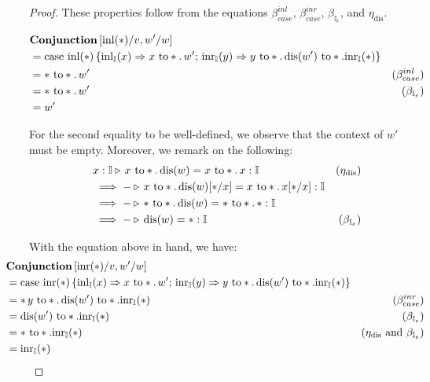   \begin{proof}
    These properties follow from the equations $\beta_{case}^{inl}$, $\beta_{case}^{inr}$, $\beta_{\mathbb{I}_{e}}$, and $\eta_{\text{dis}}$.

    \begin{equation*}
    \begin{split}
      & \textbf{Conjunction} \, [\mathrm{inl}(*)/v,w'/w ] \\
      & = \text{case } \mathrm{inl}(*)\,
  \{\mathrm{inl}_{\mathbb{I}}(x) \Rightarrow x \text{ to} *. \, w' ;
  \, \mathrm{inr}_{\mathbb{I}}(y) \Rightarrow y \text{ to} *. \,  \text{dis}(w') \text{ to} *. \mathrm{inr}_{\mathbb{I}}(*)
  \} \\
  & = * \text{ to} *. \, w' & (\beta_{case}^{inl}) \\
  & =  * \text{ to} *. \, w' & (\beta_{\mathbb{I}_{e}}) \\
  & = w'
    \end{split}
    \end{equation*}

    For the second equality to be well-defined, we observe that the context of $ w'$ must be empty. Moreover, we remark on the following:
    \begin{align*}
       & x:\mathbb{I} \triangleright \, x \text{ to} *. \, \text{dis}(w) = x \text{ to} *. \, x : \mathbb{I}    & (\eta_{\text{dis}}) \\
       & \implies - \triangleright \,x \text{ to} *. \, \text{dis}(w)[*/x] = x \text{ to} *. \, x  [*/x]  : \mathbb{I} \\
       & \implies - \triangleright \, * \text{ to} *. \, \text{dis}(w) = * \text{ to} *. \, *  : \mathbb{I} \\
       & \implies - \triangleright \,  \text{dis}(w) = * : \mathbb{I} & (\beta_{\mathbb{I}_{e}})
    \end{align*}



    With the equation above in hand, we have:
    \begin{align*}
      & \hspace{-22pt} \textbf{Conjunction} \, [\inr(*)/v,w'/w ] \\
      & \hspace{-22pt}  = \text{case } \inr(*)\,
  \{\inl_{\typeI}(x) \Rightarrow x \text{ to} *. \, w' ;
  \, \inr_{\typeI}(y) \Rightarrow y \text{ to} *. \,  \text{dis}(w') \text{ to} *. \inr_{\typeI}(*)
  \} \\
  & \hspace{-22pt}  =  * \, y \text{ to} *. \,  \text{dis}(w') \text{ to} *. \inr_{\typeI}(*) & (\beta_{case}^{inr}) \\
  & \hspace{-22pt}  = \text{dis}(w') \text{ to} *. \inr_{\typeI}(*) & (\beta_{\mathbb{I}_{e}}) \\
  & \hspace{-22pt}  = * \text{ to} *. \inr_{\typeI}(*) &  (\eta_\text{dis} \text{ and } \beta_{\mathbb{I}_{e}}) \\
  & \hspace{-22pt}  =  \inr_{\typeI}(*)
    \end{align*}

  \end{proof}

